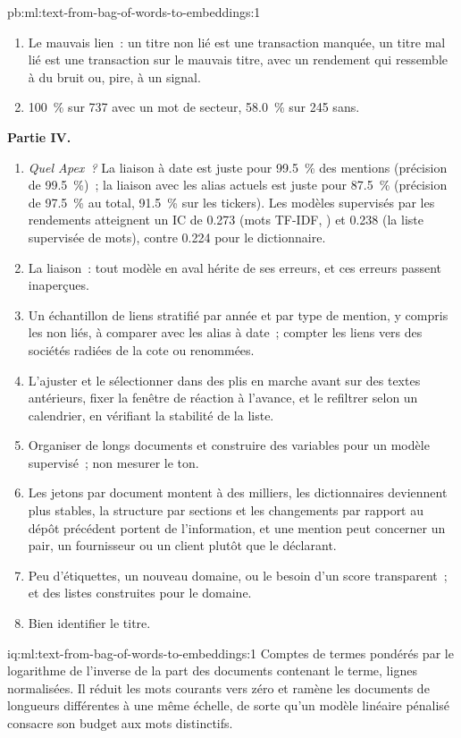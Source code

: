 \begin{solution}{pb:ml:text-from-bag-of-words-to-embeddings:1}
\begin{enumerate}[resume]
titulaire (précision de 91.5~\% sur les tickers).
\item Le mauvais lien~: un titre non lié est une transaction manquée, un titre mal lié est une transaction sur le mauvais titre, avec un
rendement qui ressemble à du bruit ou, pire, à un signal.
\item 100~\% sur 737 avec un mot de secteur, 58.0~\% sur 245 sans.
\end{enumerate}
\textbf{Partie IV.}
\begin{enumerate}[resume]
\item \emph{Quel Apex~?} La liaison à date est juste pour 99.5~\% des mentions (précision de 99.5~\%)~; la liaison avec les alias actuels
est juste pour 87.5~\% (précision de 97.5~\% au total, 91.5~\% sur les tickers). Les modèles supervisés par les rendements atteignent un IC de 0.273
(mots TF-IDF, ) et 0.238 (la liste supervisée de mots), contre 0.224 pour le dictionnaire.
\item La liaison~: tout modèle en aval hérite de ses erreurs, et ces erreurs passent inaperçues.
\item Un échantillon de liens stratifié par année et par type de mention, y compris les non liés, à comparer avec les alias à date~;
compter les liens vers des sociétés radiées de la cote ou renommées.
\item L'ajuster et le sélectionner dans des plis en marche avant sur des textes antérieurs, fixer la fenêtre de réaction à l'avance, et le refiltrer selon un
calendrier, en vérifiant la stabilité de la liste.
\item Organiser de longs documents et construire des variables pour un modèle supervisé~; non mesurer le ton.
\item Les jetons par document montent à des milliers, les dictionnaires deviennent plus stables, la structure par sections et les changements par rapport au
dépôt précédent portent de l'information, et une mention peut concerner un pair, un fournisseur ou un client plutôt que le déclarant.
\item Peu d'étiquettes, un nouveau domaine, ou le besoin d'un score transparent~; et des listes construites pour le domaine.
\item Bien identifier le titre.
\end{enumerate}
\end{solution}

\begin{solution}{iq:ml:text-from-bag-of-words-to-embeddings:1}
Comptes de termes pondérés par le logarithme de l'inverse de la part des documents contenant le terme, lignes normalisées. Il réduit les mots courants
vers zéro et ramène les documents de longueurs différentes à une même échelle, de sorte qu'un modèle linéaire pénalisé consacre son budget aux
mots distinctifs.
\end{solution}

